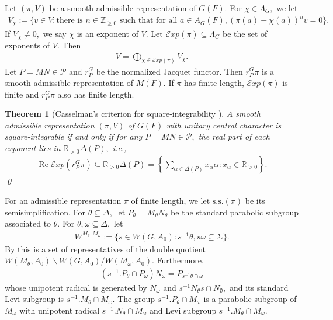 \documentclass[10pt]{amsart}
\newtheorem{theorem}{Theorem}[section]
\theoremstyle{definition}
\numberwithin{equation}{section}
\numberwithin{equation}{subsection}
\newcommand{\ZZ}{\mathbb{Z}}
\newcommand{\RR}{\mathbb{R}}
\renewcommand{\Re}{\mathop{\mathrm{Re}}}
\begin{document}
Let $(\pi,V)$ be a smooth admissible representation of $G(F)$. For $\chi\in \Lambda_G,$ we let
\begin{align*}
     V_\chi:=\{v \in V : \textrm{there is } n \in \ZZ_{\ge 0} \textrm{ such that for all } a \in A_G(F), (\pi(a)-\chi(a))^n v = 0\}.
\end{align*}
If $V_\chi\neq 0,$ we say $\chi$ is an exponent of $V$. Let $\mathcal{E}xp(\pi)\subseteq \Lambda_G$ be the set of exponents of $V$. Then
\begin{align*}
    V=\bigoplus_{\chi\in \mathcal{E}xp(\pi)} V_\chi.
\end{align*}
Let $P=MN\in \mathcal{P}$ and $r^G_P$ be the normalized Jacquet functor. Then $r^G_P \pi$ is a smooth admissible representation of $M(F)$. If $\pi$ has finite length, $\mathcal{E}xp(\pi)$ is finite and $r^G_P \pi$ also has finite length.  
\begin{theorem}[Casselman's criterion for square-integrability {\cite[VII.1.2]{Representation-p-adic}}]\label{CasselmanCriterion}
    A smooth admissible representation $(\pi,V)$ of $G(F)$ with unitary central character is square-integrable if and only if for any $P=MN\in \mathcal{P},$ the real part of each exponent lies in $\RR_{>0}\Delta(P),$ i.e.,
    \begin{align*}
        \Re \mathcal{E}xp(r^G_P\pi)\subseteq \RR_{>0}\Delta(P)= \left\{\sum_{\alpha\in\Delta(P)} x_\alpha \alpha: x_\alpha\in \RR_{>0}\right\}.
    \end{align*}\qed
\end{theorem}

For an admissible representation $\pi$ of finite length, we let $\mathrm{s.s.}(\pi)$ be its semisimplification. For $\theta\subseteq \Delta,$ let $P_\theta=M_\theta N_\theta$ be the standard parabolic subgroup associated to $\theta$. For $\theta,\omega\subseteq \Delta,$ let 
\begin{align*}
    W^{M_\theta,M_\omega} := \{s\in W(G,A_0):s^{-1}\theta, s\omega\subseteq \Sigma\}.
\end{align*}
By \cite[V.4.6]{Representation-p-adic} this is a set of representatives of the double quotient $W(M_\theta,A_0)\backslash W(G,A_0)/W(M_\omega,A_0)$. Furthermore, 
\begin{align*}
    (s^{-1}.P_\theta\cap P_\omega)N_\omega=P_{s^{-1}\theta\cap \omega}
\end{align*}
whose unipotent radical is generated by $N_\omega$ and $s^{-1}N_\theta s\cap N_\emptyset,$ and its standard Levi subgroup is $s^{-1}.M_\theta\cap M_\omega.$ The group $s^{-1}.P_\theta\cap M_\omega$ is a parabolic subgroup of $M_\omega$ with unipotent radical $s^{-1}.N_\theta  \cap M_\omega$ and Levi subgroup $s^{-1}.M_\theta \cap M_\omega$.
\end{document}
